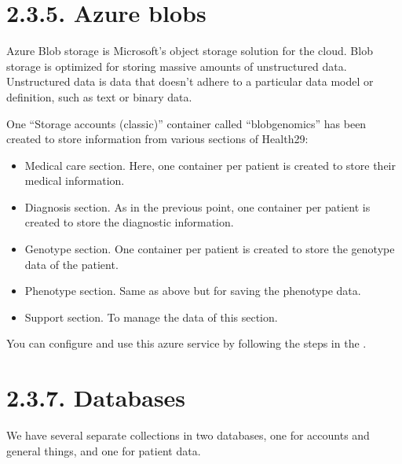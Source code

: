 \documentclass[letterpaper,10pt,english]{sphinxmanual}
\begin{document}
\section{2.3.5. Azure blobs}
\label{\detokenize{pages/SW/Components:azure-blobs}}
Azure Blob storage is Microsoft’s object storage solution for the cloud. Blob storage is optimized for storing massive amounts of unstructured data. Unstructured data is data that doesn’t adhere to a particular data model or definition, such as text or binary data.

One “Storage accounts (classic)” container called “blobgenomics” has been created to store information from various sections of Health29:
\begin{itemize}
\item {} 
Medical care section. Here, one container per patient is created to store their medical information.

\item {} 
Diagnosis section. As in the previous point, one container per patient is created to store the diagnostic information.

\item {} 
Genotype section. One container per patient is created to store the genotype data of the patient.

\item {} 
Phenotype section. Same as above but for saving the phenotype data.

\item {} 
Support section. To manage the data of this section.

\end{itemize}

You can configure and use this azure service by following the steps in the .


\section{2.3.7. Databases}
\label{\detokenize{pages/SW/Components:databases}}
We have several separate collections in two databases, one for accounts and general things, and one for patient data.
\end{document}
